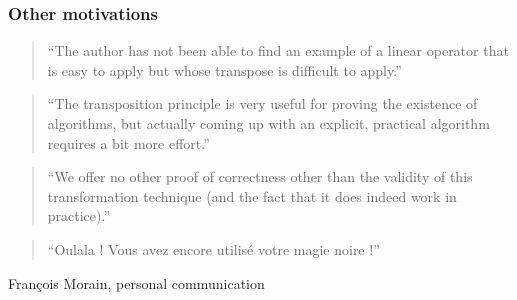 \documentclass[10pt]{beamer}
\begin{document}

\begin{frame}
  \frametitle{Other motivations}

  \begin{quote}
    ``The author has not been able to find an example of a linear
    operator that is easy to apply but whose transpose is difficult to
    apply.''
  \end{quote}
  \hfill\cite{Wie86}
  
  \begin{quote}
    ``The transposition principle is very useful for proving the
    existence of algorithms, but actually coming up with an explicit,
    practical algorithm requires a bit more effort.''
  \end{quote}
  \hfill\cite{Sho95}

  \begin{quote}
    ``We offer no other proof of correctness other than the validity
    of this transformation technique (and the fact that it does indeed
    work in practice).''
  \end{quote}
  \hfill\cite{Sho95}

  \begin{quote}
    ``Oulala ! Vous avez encore utilisé votre magie noire !''
  \end{quote}
  \hfill François Morain, personal communication
\end{frame}

\end{document}
